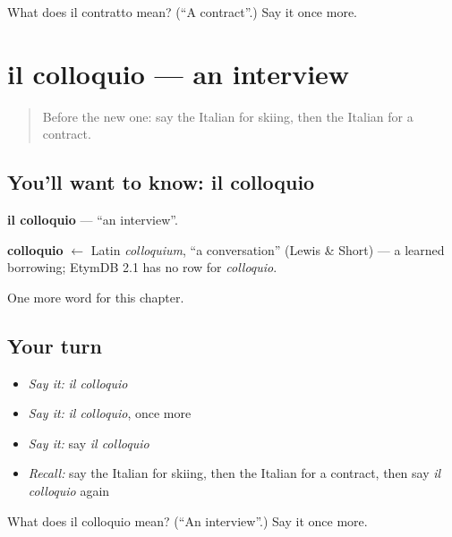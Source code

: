 \begin{tcolorbox}[breakable,colback=teal!4,colframe=teal!35!black,title={Before you move on}]
What does il contratto mean? (\textquotedblleft{}A contract\textquotedblright{}.) Say it once more.
\end{tcolorbox}
\section[il colloquio]{il colloquio — an interview}

\label{lesson:IT-C203-colloquio}



\begin{quote}
Before the new one: say the Italian for skiing, then the Italian for a contract.
\end{quote}

\subsection*{You'll want to know: il colloquio}
\textbf{il colloquio} — \textquotedblleft{}an interview\textquotedblright{}.

\begin{cousinweb}
\textbf{colloquio} $\leftarrow$ Latin \emph{colloquium}, \textquotedblleft{}a conversation\textquotedblright{} (Lewis \& Short) — a learned borrowing; EtymDB 2.1 has no row for \emph{colloquio}.
\end{cousinweb}

\begin{grammarlens}[title={What you've built}]
One more word for this chapter.
\end{grammarlens}

\subsection*{Your turn}
\begin{itemize}
\raggedright
  \item \emph{Say it:} \emph{il colloquio}
  \item \emph{Say it:} \emph{il colloquio}, once more
  \item \emph{Say it:} say \emph{il colloquio}
  \item \emph{Recall:} say the Italian for skiing, then the Italian for a contract, then say \emph{il colloquio} again
\end{itemize}

\begin{tcolorbox}[breakable,colback=teal!4,colframe=teal!35!black,title={Before you move on}]
What does il colloquio mean? (\textquotedblleft{}An interview\textquotedblright{}.) Say it once more.
\end{tcolorbox}
